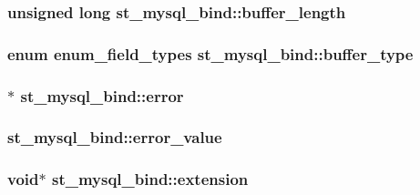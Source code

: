 \subsubsection[{buffer\+\_\+length}]{\setlength{\rightskip}{0pt plus 5cm}unsigned long st\+\_\+mysql\+\_\+bind\+::buffer\+\_\+length}\label{structst__mysql__bind_a58fff187be9d3e492856a50f970b469f}
\hypertarget{structst__mysql__bind_ad3de66e824b46991edcc4ddbb3747ced}{}
\subsubsection[{buffer\+\_\+type}]{\setlength{\rightskip}{0pt plus 5cm}enum {\bf enum\+\_\+field\+\_\+types} st\+\_\+mysql\+\_\+bind\+::buffer\+\_\+type}\label{structst__mysql__bind_ad3de66e824b46991edcc4ddbb3747ced}
\hypertarget{structst__mysql__bind_a555fb0921bc7a50e54c863b702a75259}{}
\subsubsection[{error}]{$\ast$ st\+\_\+mysql\+\_\+bind\+::error}\label{structst__mysql__bind_a555fb0921bc7a50e54c863b702a75259}
\hypertarget{structst__mysql__bind_ac69cf2bf54564d646fbcf12c6981f18d}{}
\subsubsection[{error\+\_\+value}]{ st\+\_\+mysql\+\_\+bind\+::error\+\_\+value}\label{structst__mysql__bind_ac69cf2bf54564d646fbcf12c6981f18d}
\hypertarget{structst__mysql__bind_ac8e250bd8df7c1ff2921c3cb5c2ed564}{}
\subsubsection[{extension}]{\setlength{\rightskip}{0pt plus 5cm}void$\ast$ st\+\_\+mysql\+\_\+bind\+::extension}\label{structst__mysql__bind_ac8e250bd8df7c1ff2921c3cb5c2ed564}
\hypertarget{structst__mysql__bind_a1398006bc3b49e8a61084188976929ae}{}
